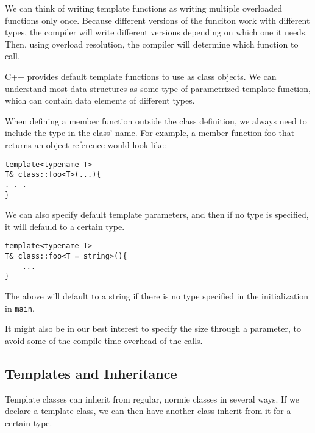 \documentclass{article}
\begin{document}
We can think of writing template functions as writing multiple overloaded functions only once. Because different
versions of the funciton work with different types, the compiler will write different versions depending 
on which one it needs. Then, using overload resolution, the compiler will determine which function to 
call. 

C++ provides default template functions to use as class objects. We can understand most data structures as 
some type of parametrized template function, which can contain data  elements of different types.

When defining a member function outside the class definition, we always need to include the type in the 
class' name. For example, a member function foo that returns an object reference would look like: 
\begin{verbatim}
template<typename T>
T& class::foo<T>(...){
. . .
}
\end{verbatim}
We can also specify default template parameters, and then if no type is specified, it will defauld to a 
certain type. 
\begin{verbatim}
template<typename T>
T& class::foo<T = string>(){
	...
}
\end{verbatim}
The above will default to a string if there is no type specified in the initialization in \texttt{main}.

It might also be in our best interest to specify the size through a parameter, to avoid some of the 
compile time overhead of the calls.
\subsection{Templates and Inheritance}
Template classes can inherit from regular, normie classes in several ways. If we declare a template class, 
we can then have another class inherit from it for a certain type. 
\end{document}
